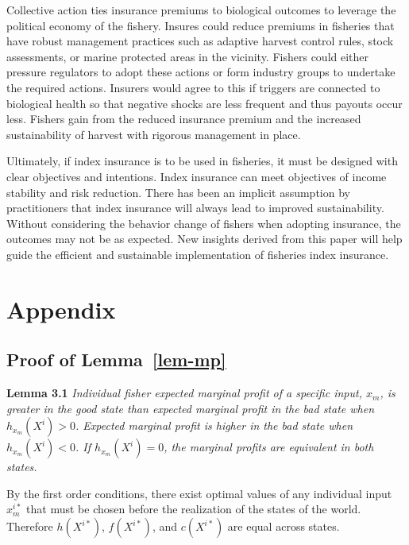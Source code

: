 \documentclass[
  letterpaper,
  DIV=11,
  numbers=noendperiod]{scrartcl}
\theoremstyle{plain}
\theoremstyle{plain}
\theoremstyle{remark}
\begin{document}
Collective action ties insurance premiums to biological outcomes to
leverage the political economy of the fishery. Insures could reduce
premiums in fisheries that have robust management practices such as
adaptive harvest control rules, stock assessments, or marine protected
areas in the vicinity. Fishers could either pressure regulators to adopt
these actions or form industry groups to undertake the required actions.
Insurers would agree to this if triggers are connected to biological
health so that negative shocks are less frequent and thus payouts occur
less. Fishers gain from the reduced insurance premium and the increased
sustainability of harvest with rigorous management in place.

Ultimately, if index insurance is to be used in fisheries, it must be
designed with clear objectives and intentions. Index insurance can meet
objectives of income stability and risk reduction. There has been an
implicit assumption by practitioners that index insurance will always
lead to improved sustainability. Without considering the behavior change
of fishers when adopting insurance, the outcomes may not be as expected.
New insights derived from this paper will help guide the efficient and
sustainable implementation of fisheries index insurance.

\newpage
\appendix
\renewcommand{\thefigure}{A\arabic{figure}}
\renewcommand{\thetable}{A\arabic{table}}
\setcounter{figure}{0}
\setcounter{table}{0}

\hypertarget{appendix}{%
\section{Appendix}\label{appendix}}

\hypertarget{proof-of-lem-mp}{%
\subsection{\texorpdfstring{Proof of
Lemma~\ref{lem-mp}}{Proof of Lemma~}}\label{proof-of-lem-mp}}

\textbf{Lemma 3.1} \emph{Individual fisher expected marginal profit of a
specific input, \(x_m\), is greater in the good state than expected
marginal profit in the bad state when \(h_{x_m}(X^i)>0\). Expected
marginal profit is higher in the bad state when \(h_{x_m}(X^i)<0\). If
\(h_{x_m}(X^i)=0\), the marginal profits are equivalent in both states.}

By the first order conditions, there exist optimal values of any
individual input \(x_m^{i*}\) that must be chosen before the realization
of the states of the world. Therefore \(h(X^{i*})\), \(f(X^{i*})\), and
\(c(X^{i*})\) are equal across states.
\end{document}
